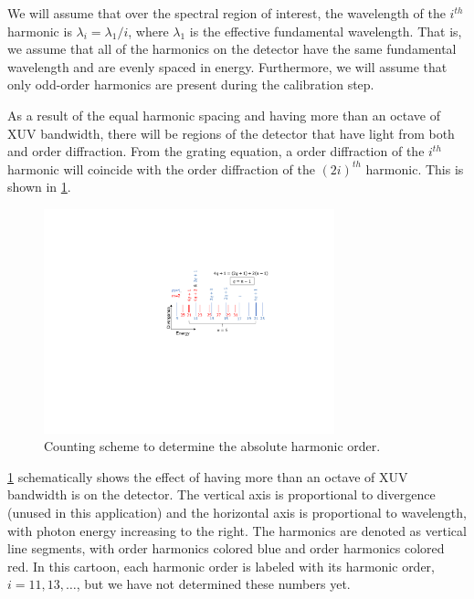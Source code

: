 We will assume that over the spectral region of interest, the wavelength of the $i^{th}$ harmonic is $\lambda_i = \lambda_1 / i$, where $\lambda_1$ is the effective fundamental wavelength. That is, we assume that all of the harmonics on the detector have the same fundamental wavelength and are evenly spaced in energy. Furthermore, we will assume that only odd-order harmonics are present during the calibration step.

As a result of the equal harmonic spacing and having more than an octave of XUV bandwidth, there will be regions of the detector that have light from both  and  order diffraction. From the grating equation, a  order diffraction of the $i^{th}$ harmonic will coincide with the  order diffraction of the $(2i)^{th}$ harmonic. This is shown in \cref{fig:harmonic_counting}.

\begin{figure}
	\centering
	\includegraphics[width=0.75\textwidth]{figures/chap2/harmonic_counting.pdf}
	\caption{Counting scheme to determine the absolute harmonic order.}
	\label{fig:harmonic_counting}
\end{figure}

\cref{fig:harmonic_counting} schematically shows the effect of having more than an octave of XUV bandwidth is on the detector. The vertical axis is proportional to divergence (unused in this application) and the horizontal axis is proportional to wavelength, with photon energy increasing to the right. The harmonics are denoted as vertical line segments, with  order harmonics colored blue and  order harmonics colored red. In this cartoon, each harmonic order is labeled with its harmonic order, $i = 11, 13, \dots$, but we have not determined these numbers yet.

